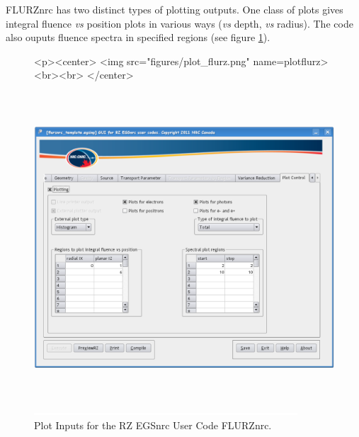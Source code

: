 \documentclass[12pt,twoside]{article}   %
\begin{document}
FLURZnrc has two distinct types of plotting outputs. One class of plots gives integral fluence {\em vs}
position plots in various ways ({\em vs} depth, {\em vs} radius). The code also ouputs fluence spectra
in specified regions (see figure \ref{plotflurz}).
\begin{figure}[htb]
\begin{htmlonly}
\begin{rawhtml}
<p><center>
<img src="figures/plot_flurz.png" name=plotflurz><br><br>
</center>
\end{rawhtml}
\end{htmlonly}
\begin{latexonly}
\begin{center}
\includegraphics[height=11.56cm]{figures/plot_flurz}
\end{center}
\end{latexonly}
\begin{center}
\includegraphics[height=1mm]{figures/fake2}
\end{center}
\caption{Plot Inputs for the RZ EGSnrc User Code FLURZnrc.}
\label{plotflurz}
\end{figure}

\clearpage
\vspace*{-1.7cm}

\typeout{}
\typeout{}

\setlength{\parindent}{0em}
\end{document}
